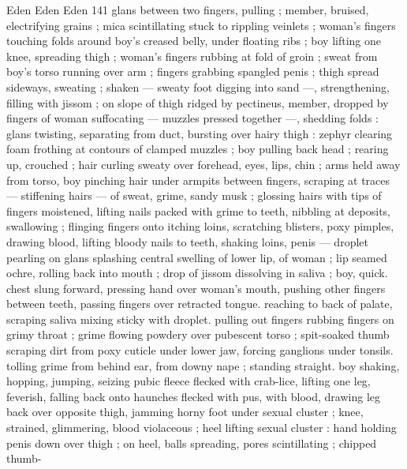 Eden Eden Eden 141
glans between two fingers, pulling ; member, bruised, electrifying
grains ; mica scintillating stuck to rippling veinlets ; woman's fingers
touching folds around boy's creased belly, under floating ribs ; boy
lifting one knee, spreading thigh ; woman's fingers rubbing at fold of
groin ; sweat from boy's torso running over arm ; fingers grabbing
spangled penis ; thigh spread sideways, sweating ; shaken — sweaty
foot digging into sand —, strengthening, filling with jissom ; on
slope of thigh ridged by pectineus, member, dropped by fingers of
woman suffocating — muzzles pressed together —, shedding folds
: glans twisting, separating from duct, bursting over hairy thigh :
zephyr clearing foam frothing at contours of clamped muzzles ; boy
pulling back head ; rearing up, crouched ; hair curling sweaty over
forehead, eyes, lips, chin ; arms held away from torso, boy pinching
hair under armpits between fingers, scraping at traces — stiffening
hairs — of sweat, grime, sandy musk ; glossing hairs with tips of
fingers moistened, lifting nails packed with grime to teeth, nibbling
at deposits, swallowing ; flinging fingers onto itching loins,
scratching blisters, poxy pimples, drawing blood, lifting bloody nails
to teeth, shaking loins, penis — droplet pearling on glans splashing
central swelling of lower lip, of woman ; lip seamed ochre, rolling
back into mouth ; drop of jissom dissolving in saliva ; boy, quick.
chest slung forward, pressing hand over woman's mouth, pushing
other fingers between teeth, passing fingers over retracted tongue.
reaching to back of palate, scraping saliva mixing sticky with droplet.
pulling out fingers rubbing fingers on grimy throat ; grime flowing
powdery over pubescent torso ; spit-soaked thumb scraping dirt
from poxy cuticle under lower jaw, forcing ganglions under tonsils.
tolling grime from behind ear, from downy nape ; standing straight.
boy shaking, hopping, jumping, seizing pubic fleece flecked with
crab-lice, lifting one leg, feverish, falling back onto haunches flecked
with pus, with blood, drawing leg back over opposite thigh, jamming
horny foot under sexual cluster ; knee, strained, glimmering, blood
violaceous ; heel lifting sexual cluster : hand holding penis down over
thigh ; on heel, balls spreading, pores scintillating ; chipped thumb-

